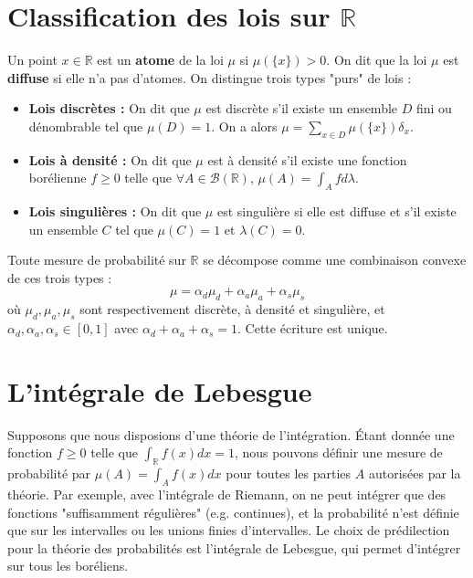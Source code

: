 \section{Classification des lois sur $\mathbb{R}$}
Un point $x \in \mathbb{R}$ est un \textbf{atome} de la loi $\mu$ si $\mu(\{x\}) > 0$.
On dit que la loi $\mu$ est \textbf{diffuse} si elle n'a pas d'atomes.
On distingue trois types "purs" de lois :
\begin{itemize}
    \item \textbf{Lois discrètes :} On dit que $\mu$ est discrète s'il existe un ensemble $D$ fini ou dénombrable tel que $\mu(D) = 1$. On a alors $\mu = \sum_{x \in D} \mu(\{x\}) \delta_x$.
    \item \textbf{Lois à densité :} On dit que $\mu$ est à densité s'il existe une fonction borélienne $f \ge 0$ telle que $\forall A \in \mathcal{B}(\mathbb{R})$, $\mu(A) = \int_A f d\lambda$.
    \item \textbf{Lois singulières :} On dit que $\mu$ est singulière si elle est diffuse et s'il existe un ensemble $C$ tel que $\mu(C)=1$ et $\lambda(C)=0$.
\end{itemize}
Toute mesure de probabilité sur $\mathbb{R}$ se décompose comme une combinaison convexe de ces trois types :
\[
\mu = \alpha_d \mu_d + \alpha_a \mu_a + \alpha_s \mu_s
\]
où $\mu_d, \mu_a, \mu_s$ sont respectivement discrète, à densité et singulière, et $\alpha_d, \alpha_a, \alpha_s \in [0,1]$ avec $\alpha_d + \alpha_a + \alpha_s = 1$. Cette écriture est unique.
\section{L'intégrale de Lebesgue}
Supposons que nous disposions d'une théorie de l'intégration. Étant donnée une fonction $f \ge 0$ telle que $\int_{\mathbb{R}} f(x) dx = 1$, nous pouvons définir une mesure de probabilité par $\mu(A) = \int_A f(x) dx$ pour toutes les parties $A$ autorisées par la théorie.
Par exemple, avec l'intégrale de Riemann, on ne peut intégrer que des fonctions "suffisamment régulières" (e.g. continues), et la probabilité n'est définie que sur les intervalles ou les unions finies d'intervalles.
Le choix de prédilection pour la théorie des probabilités est l'intégrale de Lebesgue, qui permet d'intégrer sur tous les boréliens.
